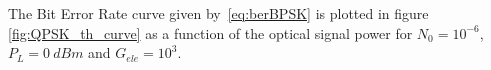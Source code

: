 



%
%
%
%
%

The Bit Error Rate curve given by~\eqref{eq:berBPSK} is plotted in figure \ref{fig:QPSK_th_curve} as a function of the optical signal power for $N_0=10^{-6}$, $P_L = 0~dBm$ and $G_{ele} = 10^3$.

